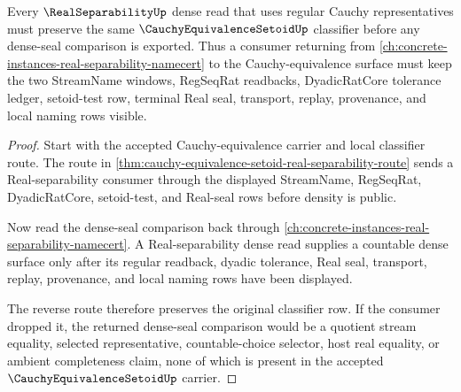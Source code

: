 \begin{theorem}
\label{thm:cauchy-equivalence-setoid-real-separability-reverse-route}
Every $\RealSeparabilityUp$ dense read that uses regular Cauchy representatives must preserve the same $\CauchyEquivalenceSetoidUp$ classifier before any dense-seal comparison is exported. Thus a consumer returning from \autoref{ch:concrete-instances-real-separability-namecert} to the Cauchy-equivalence surface must keep the two StreamName windows, RegSeqRat readbacks, DyadicRatCore tolerance ledger, setoid-test row, terminal Real seal, transport, replay, provenance, and local naming rows visible.
\end{theorem}
\begin{proof}
Start with the accepted Cauchy-equivalence carrier and local classifier route. The route in \autoref{thm:cauchy-equivalence-setoid-real-separability-route} sends a Real-separability consumer through the displayed StreamName, RegSeqRat, DyadicRatCore, setoid-test, and Real-seal rows before density is public.

Now read the dense-seal comparison back through \autoref{ch:concrete-instances-real-separability-namecert}. A Real-separability dense read supplies a countable dense surface only after its regular readback, dyadic tolerance, Real seal, transport, replay, provenance, and local naming rows have been displayed.

The reverse route therefore preserves the original classifier row. If the consumer dropped it, the returned dense-seal comparison would be a quotient stream equality, selected representative, countable-choice selector, host real equality, or ambient completeness claim, none of which is present in the accepted $\CauchyEquivalenceSetoidUp$ carrier.
\end{proof}
